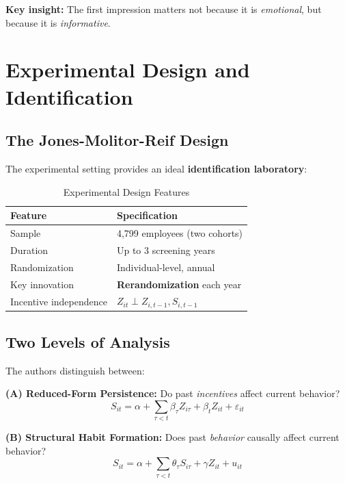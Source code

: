 \textbf{Key insight:} The first impression matters not because it is \textit{emotional}, but because it is \textit{informative}.


\section{Experimental Design and Identification}
\label{sec:hf-identification}

\subsection{The Jones-Molitor-Reif Design}

The experimental setting provides an ideal \textbf{identification laboratory}:

\begin{table}[htbp]
\centering
\caption{Experimental Design Features}
\label{tab:hf-design}
\renewcommand{\arraystretch}{1.3}
\begin{tabular}{@{}ll@{}}
\toprule
\textbf{Feature} & \textbf{Specification} \\
\midrule
Sample & 4,799 employees (two cohorts) \\
Duration & Up to 3 screening years \\
Randomization & Individual-level, annual \\
Key innovation & \textbf{Rerandomization} each year \\
Incentive independence & $Z_{it} \perp Z_{i,t-1}, S_{i,t-1}$ \\
\bottomrule
\end{tabular}
\end{table}

\subsection{Two Levels of Analysis}

The authors distinguish between:

\textbf{(A) Reduced-Form Persistence:} Do past \textit{incentives} affect current behavior?
\begin{equation}
S_{it} = \alpha + \sum_{\tau < t} \beta_\tau Z_{i\tau} + \beta_t Z_{it} + \varepsilon_{it}
\end{equation}

\textbf{(B) Structural Habit Formation:} Does past \textit{behavior} causally affect current behavior?
\begin{equation}
S_{it} = \alpha + \sum_{\tau < t} \theta_\tau S_{i\tau} + \gamma Z_{it} + u_{it}
\end{equation}

